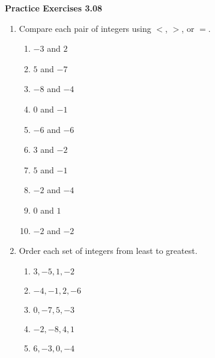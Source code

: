 \vspace{0.3ex}
\noindent\textbf{Practice Exercises 3.08}

\vspace{0.2ex}

\begin{enumerate}[noitemsep, label = \color{blue}\Alph*. ]
    \item Compare each pair of integers using \(<\), \(>\), or \(=\).
\begin{multicols}{2}
      \begin{enumerate}[noitemsep, label = \color{blue}\arabic*. ]
            \item \( -3 \) and \( 2 \)
            \item \( 5 \) and \( -7 \)
            \item \( -8 \) and \( -4 \)
            \item \( 0 \) and \( -1 \)
            \item \( -6 \) and \( -6 \)
            \item \( 3 \) and \( -2 \)
            \item \( 5 \) and \( -1 \)
            \item \( -2 \) and \( -4 \)
            \item \( 0 \) and \( 1 \)
            \item \( -2 \) and \( -2 \)              
        \end{enumerate}
    \end{multicols}

    \item Order each set of integers from least to greatest.
\begin{multicols}{2}
      \begin{enumerate}[noitemsep, label = \color{blue}\arabic*. ]
            \item \( 3, -5, 1, -2 \)
            \item \( -4, -1, 2, -6 \)
            \item \( 0, -7, 5, -3 \)
            \item \( -2, -8, 4, 1 \)
            \item \( 6, -3, 0, -4 \)
        \end{enumerate}
    \end{multicols}
\end{enumerate}

